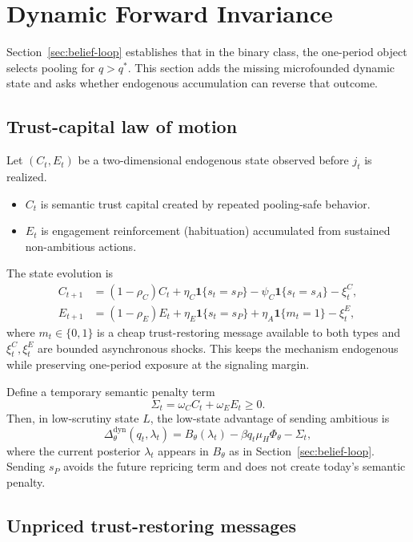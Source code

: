 \section{Dynamic Forward Invariance}
\label{sec:dynamic-model}

Section~\ref{sec:belief-loop} establishes that in the binary class, the one-period object selects pooling for $q>q^*$. This section adds the missing microfounded dynamic state and asks whether endogenous accumulation can reverse that outcome.

\subsection{Trust-capital law of motion}

Let $(C_t,E_t)$ be a two-dimensional endogenous state observed before $j_t$ is realized.
\begin{itemize}
\item $C_t$ is semantic trust capital created by repeated pooling-safe behavior.
\item $E_t$ is engagement reinforcement (habituation) accumulated from sustained non-ambitious actions.
\end{itemize}
The state evolution is
\[
\begin{aligned}
C_{t+1}&=(1-\rho_C)C_t + \eta_C\mathbf 1\{s_t=s_P\} - \psi_C\mathbf 1\{s_t=s_A\} -\xi_t^C,\\
E_{t+1}&=(1-\rho_E)E_t + \eta_E\mathbf 1\{s_t=s_P\}+\eta_A\mathbf 1\{m_t=1\} -\xi_t^E,
\end{aligned}
\]
where $m_t\in\{0,1\}$ is a cheap trust-restoring message available to both types and $\xi_t^C,\xi_t^E$ are bounded asynchronous shocks. This keeps the mechanism endogenous while preserving one-period exposure at the signaling margin.

Define a temporary semantic penalty term
\[
\Sigma_t=\omega_C C_t+\omega_E E_t\ge 0.
\]
Then, in low-scrutiny state $L$, the low-state advantage of sending ambitious is
\[
\Delta_\theta^{\text{dyn}}(q_t,\lambda_t)=B_\theta(\lambda_t)-\beta q_t\mu_H\Phi_\theta-\Sigma_t,
\]
where the current posterior $\lambda_t$ appears in $B_\theta$ as in Section~\ref{sec:belief-loop}. Sending $s_P$ avoids the future repricing term and does not create today's semantic penalty.

\subsection{Unpriced trust-restoring messages}


